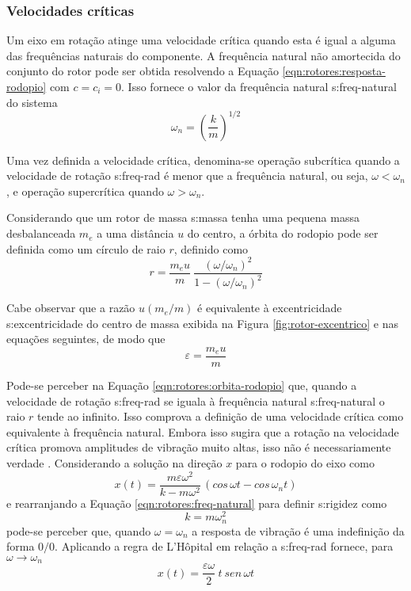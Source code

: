 \documentclass[12pt,openright,oneside,a4paper,
	chapter=TITLE,section=TITLE,
	english,brazil]{abntex2}
\begin{document}
	\subsubsection{Velocidades críticas}
	Um eixo em rotação atinge uma velocidade crítica quando esta é igual a alguma das frequências naturais do componente. A frequência natural não amortecida do conjunto do rotor pode ser obtida \cite{rao:2008} resolvendo a Equação \ref{eqn:rotores:resposta-rodopio} com $ c = c_i = 0 $. Isso fornece o valor da frequência natural \gls{s:freq-natural} do sistema
	\begin{equation} \label{eqn:rotores:freq-natural}
		\omega_n = \left( \frac{k}{m} \right)^{1/2}
	\end{equation}
	
	Uma vez definida a velocidade crítica, denomina-se \cite{dimarogonas:1995} operação subcrítica quando a velocidade de rotação \gls{s:freq-rad} é menor que a frequência natural, ou seja, $ \omega < \omega_n $, e operação supercrítica quando $ \omega > \omega_n $.
	
	Considerando que um rotor de massa \gls{s:massa} tenha uma pequena massa desbalanceada $ m_e $ a uma distância $ u $ do centro, a órbita do rodopio pode ser definida como um círculo de raio $ r $, definido como \cite{dimarogonas:1995}
	\begin{equation} \label{eqn:rotores:orbita-rodopio}
		r = \frac{m_e u}{m}\ \frac{(\omega/\omega_n)^2}{1 - (\omega/\omega_n)^2}
	\end{equation}
	
	Cabe observar que a razão $ u(m_e/m) $ é equivalente à excentricidade \gls{s:excentricidade} do centro de massa exibida na Figura \ref{fig:rotor-excentrico} e nas equações seguintes, de modo que
	\begin{equation}
		\varepsilon = \frac{m_e u}{m}
	\end{equation}
	
	Pode-se perceber na Equação \ref{eqn:rotores:orbita-rodopio} que, quando a velocidade de rotação \gls{s:freq-rad} se iguala à frequência natural \gls{s:freq-natural} o raio $ r $ tende ao infinito. Isso comprova a definição de uma velocidade crítica como equivalente à frequência natural. Embora isso sugira que a rotação na velocidade crítica promova amplitudes de vibração muito altas, isso não é necessariamente verdade \cite{dimarogonas:1995}. Considerando a solução na direção $ x $ para o rodopio do eixo como \cite{dimarogonas:1995}
	\begin{equation}
		x(t) = \frac{m\varepsilon\omega^2}{k-m\omega^2}\,(cos\,\omega t - cos\,\omega_n t)
	\end{equation}
	e rearranjando a Equação \ref{eqn:rotores:freq-natural} para definir \gls{s:rigidez} como \[ k = m\omega_n^2 \] pode-se perceber que, quando $ \omega = \omega_n $ a resposta de vibração é uma indefinição da forma $ 0/0 $. Aplicando a regra de L'Hôpital em relação a \gls{s:freq-rad} fornece, para $ \omega\to\omega_n $
	\begin{equation}
		x(t) = \frac{\varepsilon\omega}{2}\ t\ sen\,\omega t
	\end{equation}
	
\end{document}
